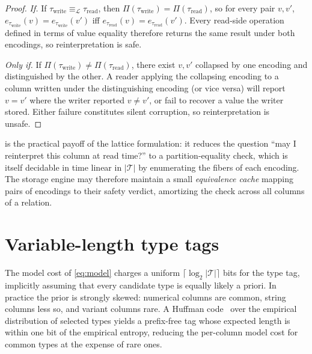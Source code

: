 \documentclass[10pt]{article}
\theoremstyle{definition}
\theoremstyle{remark}
\newcommand{\Tcal}{\mathcal{T}}
\newcommand{\eqL}{\equiv_{\mathcal{L}}}
\begin{document}
\begin{proof}
\emph{If.} If $\tau_{\mathrm{write}} \eqL \tau_{\mathrm{read}}$, then
$\Pi(\tau_{\mathrm{write}}) = \Pi(\tau_{\mathrm{read}})$, so for every
pair $v, v'$, $e_{\tau_{\mathrm{write}}}(v) = e_{\tau_{\mathrm{write}}}(v')$
iff $e_{\tau_{\mathrm{read}}}(v) = e_{\tau_{\mathrm{read}}}(v')$. Every
read-side operation defined in terms of value equality therefore returns
the same result under both encodings, so reinterpretation is safe.

\emph{Only if.} If $\Pi(\tau_{\mathrm{write}}) \neq
\Pi(\tau_{\mathrm{read}})$, there exist $v, v'$ collapsed by one encoding
and distinguished by the other. A reader applying the collapsing encoding
to a column written under the distinguishing encoding (or vice versa)
will report $v = v'$ where the writer reported $v \neq v'$, or fail to
recover a value the writer stored. Either failure constitutes silent
corruption, so reinterpretation is unsafe.
\end{proof}

 is the practical payoff of the lattice formulation: it
reduces the question ``may I reinterpret this column at read time?'' to a
partition-equality check, which is itself decidable in time linear in
$|\Tcal|$ by enumerating the fibers of each encoding. The storage engine
may therefore maintain a small \emph{equivalence cache} mapping pairs of
encodings to their safety verdict, amortizing the check across all
columns of a relation.

\section{Variable-length type tags}\label{sec:tags}

The model cost of \cref{eq:model} charges a uniform
$\lceil \log_2 |\Tcal| \rceil$ bits for the type tag, implicitly assuming
that every candidate type is equally likely a priori. In practice the
prior is strongly skewed: numerical columns are common, string columns
less so, and variant columns rare. A Huffman code~\citep{huffman1952}
over the empirical distribution of selected types yields a prefix-free
tag whose expected length is within one bit of the empirical entropy,
reducing the per-column model cost for common types at the expense of
rare ones.
\end{document}
